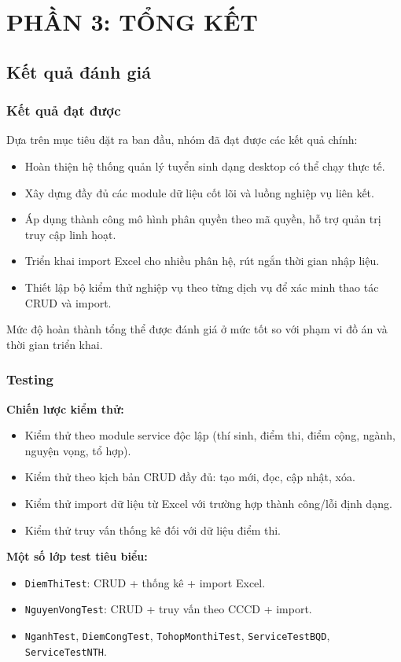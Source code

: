 \documentclass[12pt,a4paper,oneside]{report}
\begin{document}
\part*{PHẦN 3: TỔNG KẾT}

\chapter{Kết quả đánh giá}
\section{Kết quả đạt được}
Dựa trên mục tiêu đặt ra ban đầu, nhóm đã đạt được các kết quả chính:
\begin{itemize}
  \item Hoàn thiện hệ thống quản lý tuyển sinh dạng desktop có thể chạy thực tế.
  \item Xây dựng đầy đủ các module dữ liệu cốt lõi và luồng nghiệp vụ liên kết.
  \item Áp dụng thành công mô hình phân quyền theo mã quyền, hỗ trợ quản trị truy cập linh hoạt.
  \item Triển khai import Excel cho nhiều phân hệ, rút ngắn thời gian nhập liệu.
  \item Thiết lập bộ kiểm thử nghiệp vụ theo từng dịch vụ để xác minh thao tác CRUD và import.
\end{itemize}

Mức độ hoàn thành tổng thể được đánh giá ở mức tốt so với phạm vi đồ án và thời gian triển khai.

\section{Testing}
\textbf{Chiến lược kiểm thử:}
\begin{itemize}
  \item Kiểm thử theo module service độc lập (thí sinh, điểm thi, điểm cộng, ngành, nguyện vọng, tổ hợp).
  \item Kiểm thử theo kịch bản CRUD đầy đủ: tạo mới, đọc, cập nhật, xóa.
  \item Kiểm thử import dữ liệu từ Excel với trường hợp thành công/lỗi định dạng.
  \item Kiểm thử truy vấn thống kê đối với dữ liệu điểm thi.
\end{itemize}

\textbf{Một số lớp test tiêu biểu:}
\begin{itemize}
  \item \texttt{DiemThiTest}: CRUD + thống kê + import Excel.
  \item \texttt{NguyenVongTest}: CRUD + truy vấn theo CCCD + import.
  \item \texttt{NganhTest}, \texttt{DiemCongTest}, \texttt{TohopMonthiTest}, \texttt{ServiceTestBQD}, \texttt{ServiceTestNTH}.
\end{itemize}
\end{document}
